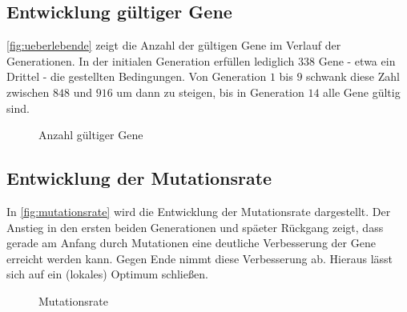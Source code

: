 \newpage
\subsection{Entwicklung gültiger Gene}

\autoref{fig:ueberlebende} zeigt die Anzahl der gültigen Gene im Verlauf der Generationen.
In der initialen Generation erfüllen lediglich $338$ Gene - etwa ein Drittel - die gestellten Bedingungen.
Von Generation $1$ bis $9$ schwank diese Zahl zwischen $848$ und $916$ um dann zu steigen,
 bis in Generation $14$ alle Gene gültig sind.

\begin{figure}[ht]
    \centering
	\caption{Anzahl gültiger Gene}
	\label{fig:ueberlebende}
\end{figure}

\subsection{Entwicklung der Mutationsrate}

In \autoref{fig:mutationsrate} wird die Entwicklung der Mutationsrate dargestellt.
Der Anstieg in den ersten beiden Generationen und späeter Rückgang zeigt,
dass gerade am Anfang durch Mutationen eine deutliche Verbesserung der Gene erreicht werden kann.
Gegen Ende nimmt diese Verbesserung ab. Hieraus lässt sich auf ein (lokales) Optimum schließen.

\begin{figure}[ht]
    \centering
    \caption{Mutationsrate}
    \label{fig:mutationsrate}
\end{figure}

